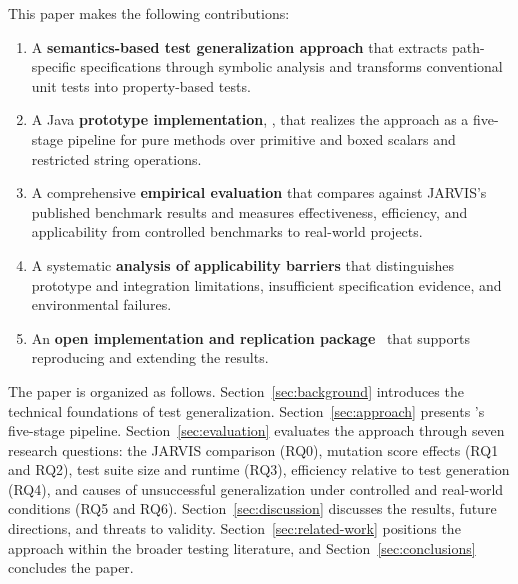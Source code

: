 This paper makes the following contributions:

\begin{enumerate}
\item A \textbf{semantics-based test generalization approach} that extracts path-specific specifications through symbolic analysis and transforms conventional unit tests into property-based tests.
\item A Java \textbf{prototype implementation}, \ToolTeralizer{}, that realizes the approach as a five-stage pipeline for pure methods over primitive and boxed scalars and restricted string operations.
\item A comprehensive \textbf{empirical evaluation} that compares against JARVIS's published benchmark results and measures effectiveness, efficiency, and applicability from controlled benchmarks to real-world projects.
\item A systematic \textbf{analysis of applicability barriers} that distinguishes prototype and integration limitations, insufficient specification evidence, and environmental failures.
\item An \textbf{open implementation and replication package}~\cite{replicationpackage} that supports reproducing and extending the results.
\end{enumerate}

The paper is organized as follows.
Section~\ref{sec:background} introduces the technical foundations of test generalization.
Section~\ref{sec:approach} presents \ToolTeralizer{}'s five-stage pipeline.
Section~\ref{sec:evaluation} evaluates the approach through seven research questions:
the JARVIS comparison (RQ0), mutation score effects (RQ1 and RQ2),
test suite size and runtime (RQ3), efficiency relative to test generation (RQ4),
and causes of unsuccessful generalization under controlled and real-world conditions (RQ5 and RQ6).
Section~\ref{sec:discussion} discusses the results, future directions, and threats to validity.
Section~\ref{sec:related-work} positions the approach within the broader testing literature,
and Section~\ref{sec:conclusions} concludes the paper.
